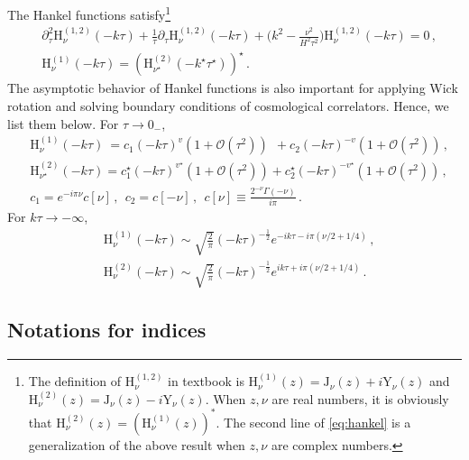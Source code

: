 \documentclass[a4paper,11pt]{article}
\newcommand{\nn}{\nonumber}
\begin{document}
The Hankel functions satisfy\footnote{The definition of $\text{H}_{\nu}^{(1,2)}$ in textbook is 
$\text{H}_{\nu}^{(1)}(z)= \text{J}_{\nu}(z)+ i \text{Y}_{\nu}(z)$ and $\text{H}_{\nu}^{(2)}(z)= \text{J}_{\nu}(z)- i \text{Y}_{\nu}(z)$. When $z,\nu$ are real numbers, it is obviously that $\text{H}_{\nu}^{(2)}(z)=(\text{H}_{\nu}^{(1)}(z))^*$. The second line of \eqref{eq:hankel} is a generalization of the above result when $z,\nu$ are complex numbers.} 
\begin{align}
  & \partial_\tau^2 \text{H}_{\nu}^{(1,2)}(-k\tau)+\frac{1}{\tau} \partial_\tau\text{H}_{\nu}^{(1,2)}(-k\tau)+\Big(k^2-\frac{\nu^2}{H^2 \tau^2}\Big)\text{H}_{\nu}^{(1,2)}(-k\tau)=0 \, ,\nn\\
  & \text{H}_{\nu}^{(1)}(-k\tau)= \left(\text{H}_{\nu^\star}^{(2)}(-k^\star\tau^\star) \right)^\star \, .\label{eq:hankel}
\end{align}
The asymptotic behavior of Hankel functions is also important for applying Wick rotation and solving boundary conditions of cosmological correlators. Hence, we list them below. For $\tau\to 0_-$,
\begin{align}
&\text{H}^{(1)}_{\nu}(-k\tau) ~ = c_1(-k\tau)^{v}(1+\mathcal{O}(\tau^2)) ~~ +  c_2(-k\tau)^{-v} (1+\mathcal{O}(\tau^2)) \, , \nn\\
&\text{H}^{(2)}_{\nu^\star}(-k\tau)= c_1^{\star}(-k\tau)^{v^\star}(1+\mathcal{O}(\tau^2)) +  c_2^{\star}(-k\tau)^{-v^\star} (1+\mathcal{O}(\tau^2)) \, , \nn\\
&c_1=e^{-i\pi\nu}c[\nu]\,, ~~ c_2=c[-\nu]\,, ~~
c[\nu]\equiv \frac{ 2^{-\nu } \Gamma (-\nu )}{i \pi }  \, .  \label{eq:Hasy0}
\end{align}
For $k \tau\to -\infty$,
\begin{align}
& \text{H}_{\nu}^{(1)}(-k\tau) \sim \sqrt{\frac{2}{\pi }} (-k \tau)^{-\frac{1}{2}}  e^{-i k \tau-i \pi  \left(\nu/2+1/4\right)}  \, , \nn\\
& \text{H}_{\nu}^{(2)}(-k\tau) \sim \sqrt{\frac{2}{\pi }} (-k \tau)^{-\frac{1}{2}}  e^{i k \tau+i \pi  \left(\nu/2+1/4\right)}  \, . \label{eq:Hasyinf}
\end{align}

\subsection{Notations for indices}
\end{document}
